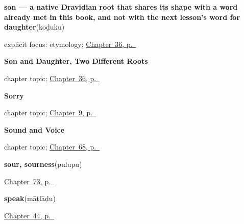 \noindent\begin{minipage}[t]{\linewidth}
\raggedright
\textbf{son — a native Dravidian root that shares its shape with a word already met in this book, and not with the next lesson's word for daughter}\enspace\emph{}\enspace(koḍuku)\par
\footnotesize explicit focus: etymology; \hyperref[ch:te-son-and-daughter]{Chapter~36, p.~\pageref*{ch:te-son-and-daughter}}
\end{minipage}\par\smallskip

\noindent\begin{minipage}[t]{\linewidth}
\raggedright
\textbf{Son and Daughter, Two Different Roots}\par
\footnotesize chapter topic; \hyperref[ch:te-son-and-daughter]{Chapter~36, p.~\pageref*{ch:te-son-and-daughter}}
\end{minipage}\par\smallskip

\noindent\begin{minipage}[t]{\linewidth}
\raggedright
\textbf{Sorry}\par
\footnotesize chapter topic; \hyperref[ch:te-sorry]{Chapter~9, p.~\pageref*{ch:te-sorry}}
\end{minipage}\par\smallskip

\noindent\begin{minipage}[t]{\linewidth}
\raggedright
\textbf{Sound and Voice}\par
\footnotesize chapter topic; \hyperref[ch:te-sound-and-voice]{Chapter~68, p.~\pageref*{ch:te-sound-and-voice}}
\end{minipage}\par\smallskip

\noindent\begin{minipage}[t]{\linewidth}
\raggedright
\textbf{sour, sourness}\enspace\emph{}\enspace(pulupu)\par
\footnotesize \hyperref[ch:te-tastes]{Chapter~73, p.~\pageref*{ch:te-tastes}}
\end{minipage}\par\smallskip

\noindent\begin{minipage}[t]{\linewidth}
\raggedright
\textbf{speak}\enspace\emph{}\enspace(māṭlāḍu)\par
\footnotesize \hyperref[ch:te-see-say]{Chapter~44, p.~\pageref*{ch:te-see-say}}
\end{minipage}\par\smallskip

